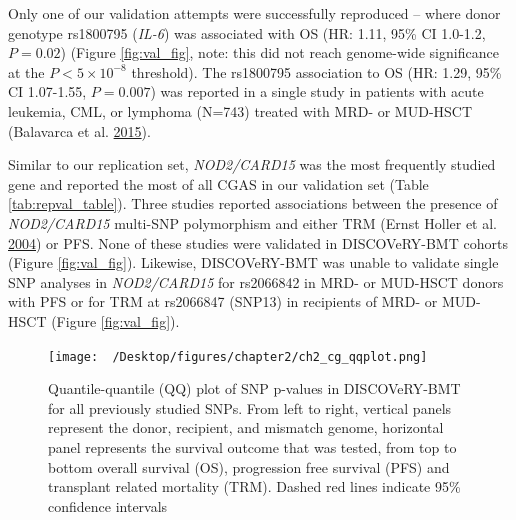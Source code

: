 \documentclass[]{DissertateOSU}
\begin{document}
Only one of our validation attempts were successfully reproduced --
where donor genotype rs1800795 (\emph{IL-6}) was associated with OS (HR:
1.11, 95\% CI 1.0-1.2, \(P=0.02\)) (Figure \ref{fig:val_fig}, note: this
did not reach genome-wide significance at the \(P < 5\times{10}^{-8}\)
threshold). The rs1800795 association to OS (HR: 1.29, 95\% CI
1.07-1.55, \(P=0.007\)) was reported in a single study in patients with
acute leukemia, CML, or lymphoma (N=743) treated with MRD- or MUD-HSCT
(Balavarca et al. \protect\hyperlink{ref-balavarca_2015}{2015}).

Similar to our replication set, \emph{NOD2/CARD15} was the most
frequently studied gene and reported the most of all CGAS in our
validation set (Table \ref{tab:repval_table}). Three studies reported
associations between the presence of \emph{NOD2/CARD15} multi-SNP
polymorphism and either TRM (Ernst Holler et al.
\protect\hyperlink{ref-holler_2004}{2004}) or PFS. None of these studies
were validated in DISCOVeRY-BMT cohorts (Figure \ref{fig:val_fig}).
Likewise, DISCOVeRY-BMT was unable to validate single SNP analyses in
\emph{NOD2/CARD15} for rs2066842 in MRD- or MUD-HSCT donors with PFS or
for TRM at rs2066847 (SNP13) in recipients of MRD- or MUD-HSCT (Figure
\ref{fig:val_fig}).

\begin{figure}
    \centering
    \texttt{[image: ~/Desktop/figures/chapter2/ch2\_cg\_qqplot.png]}
    \caption[Quantile-quantile (QQ) plot of SNP p-values in DISCOVeRY-BMT for all previously studied SNPs.]{Quantile-quantile (QQ) plot of SNP p-values in DISCOVeRY-BMT for all previously studied SNPs. From left to right, vertical panels represent the donor, recipient, and mismatch genome, horizontal panel represents the survival outcome that was tested, from top to bottom overall survival (OS), progression free survival (PFS) and transplant related mortality (TRM). Dashed red lines indicate 95\% confidence intervals}
    \label{fig:qq_genes}
\end{figure}
\end{document}
